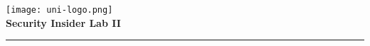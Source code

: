 \begin{titlepage}
    \centering
    \begin{onehalfspace}
    	\begin{german}
        	\texttt{[image: uni-logo.png]}\\
        	\vspace{1.0cm}
        	\large {\bfseries Security Insider Lab II}\\ 

        	\vspace{2.5cm}

            \begin{doublespace}
            	\textenglish{\textsf{\Huge{\thetitle}}}
            \end{doublespace}

        	\vspace{2cm}
    
            

        	\vspace{1cm}

        	{\bfseries \large{\theauthor}}

        	\vfill

        			

        	\vspace{1.5cm}

        	\parbox{\linewidth}{\hrule\strut}

            \vfill

	    \textgerman{\thedate}
    	\end{german}
    \end{onehalfspace}
\end{titlepage}
